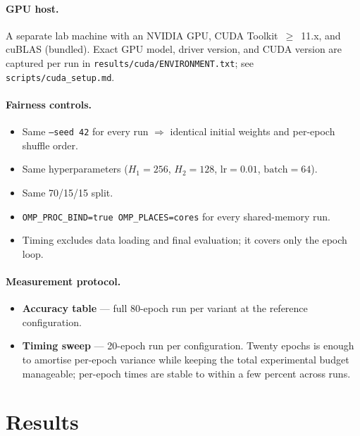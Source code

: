 \documentclass[11pt,a4paper]{article}
\begin{document}
\paragraph{GPU host.} A separate lab machine with an NVIDIA GPU, CUDA
Toolkit~$\ge$~11.x, and cuBLAS (bundled). Exact GPU model, driver
version, and CUDA version are captured per run in
\texttt{results/cuda/ENVIRONMENT.txt}; see
\texttt{scripts/cuda\_setup.md}.

\paragraph{Fairness controls.}
\begin{itemize}[noitemsep,topsep=2pt]
  \item Same \texttt{--seed 42} for every run $\Rightarrow$ identical
        initial weights and per-epoch shuffle order.
  \item Same hyperparameters
        ($H_1=256$, $H_2=128$, $\mathrm{lr}=0.01$,
        $\mathrm{batch}=64$).
  \item Same 70/15/15 split.
  \item \texttt{OMP\_PROC\_BIND=true OMP\_PLACES=cores} for every
        shared-memory run.
  \item Timing excludes data loading and final evaluation; it covers
        only the epoch loop.
\end{itemize}

\paragraph{Measurement protocol.}
\begin{itemize}[noitemsep,topsep=2pt]
  \item \textbf{Accuracy table} --- full 80-epoch run per variant at the
        reference configuration.
  \item \textbf{Timing sweep} --- 20-epoch run per configuration. Twenty
        epochs is enough to amortise per-epoch variance while keeping the
        total experimental budget manageable; per-epoch times are stable
        to within a few percent across runs.
\end{itemize}

\section{Results}\label{sec:results}
\end{document}
